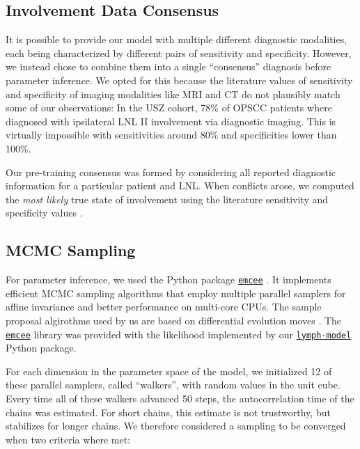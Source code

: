 \documentclass[
  sn-mathphys-num,
]{sn-jnl}
\begin{document}
\subsection{Involvement Data
Consensus}\label{involvement-data-consensus}

It is possible to provide our model with multiple different diagnostic
modalities, each being characterized by different pairs of sensitivity
and specificity. However, we instead chose to combine them into a single
``consensus'' diagnosis before parameter inference. We opted for this
because the literature values of sensitivity and specificity
\citep{de_bondt_detection_2007, kyzas_18f-fluorodeoxyglucose_2008} of
imaging modalities like MRI and CT do not plausibly match some of our
observations: In the USZ cohort, 78\% of OPSCC patients where diagnosed
with ipsilateral LNL II involvement via diagnostic imaging. This is
virtually impossible with sensitivities around 80\% and specificities
lower than 100\%.

Our pre-training consensus was formed by considering all reported
diagnostic information for a particular patient and LNL. When conflicts
arose, we computed the \emph{most likely} true state of involvement
using the literature sensitivity and specificity values
\citep{de_bondt_detection_2007, kyzas_18f-fluorodeoxyglucose_2008}.

\subsection{MCMC Sampling}\label{sec-sampling}

For parameter inference, we used the Python package
\href{https://emcee.readthedocs.io/en/stable/}{\texttt{emcee}}
\citep{foreman-mackey_emcee_2013}. It implements efficient MCMC sampling
algorithms that employ multiple parallel samplers for affine invariance
and better performance on multi-core CPUs. The sample proposal
algirothms used by us are based on differential evolution moves
\citep{ter_braak_differential_2008, nelson_run_2013}. The
\href{https://emcee.readthedocs.io/en/stable/}{\texttt{emcee}} library
was provided with the likelihood implemented by our
\href{https://lymph-model.readthedocs.io/en/stable/}{\texttt{lymph-model}}
Python package.

For each dimension in the parameter space of the model, we initialized
12 of these parallel samplers, called ``walkers'', with random values in
the unit cube. Every time all of these walkers advanced 50 steps, the
autocorrelation time of the chains was estimated. For short chains, this
estimate is not trustworthy, but stabilizes for longer chains. We
therefore considered a sampling to be converged when two criteria where
met:
\end{document}
